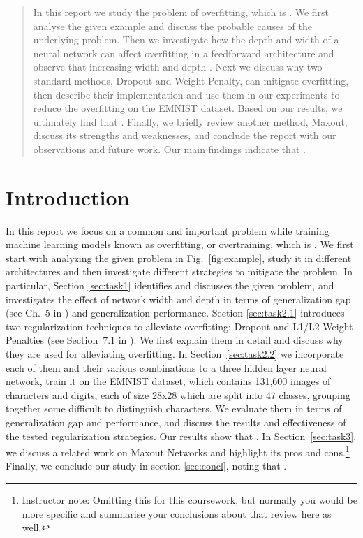 \documentclass{article}
\begin{document}
 


\begin{abstract} 
In this report we study the problem of overfitting, which is \questionOne.
We first analyse the given example and discuss the probable causes of the underlying problem. 
Then we investigate how the depth and width of a neural network
can affect overfitting in a feedforward architecture and observe that increasing width and depth \questionTwo.
Next we discuss why two standard methods, Dropout and Weight Penalty, can
mitigate overfitting, then describe their implementation and use them in our experiments
to reduce the overfitting on the EMNIST dataset. 
Based on our results, we ultimately find that \questionThree.
Finally, we briefly review another method, Maxout, discuss its strengths and weaknesses, and conclude the report with our observations and future work. Our main findings indicate that \questionFour.
\end{abstract} 

\section{Introduction}
\label{sec:intro}
In this report we focus on a common and important problem while training machine learning models known as overfitting, or overtraining, which is \questionOne.
We first start with analyzing the given problem in Fig.~\ref{fig:example}, study it in different architectures and then investigate different strategies to mitigate the problem.
In particular, Section \ref{sec:task1} identifies and discusses the given problem, and investigates the effect of network width and depth in terms of generalization gap (see Ch.~5 in \citealt{Goodfellow-et-al-2016}) and generalization performance.
Section \ref{sec:task2.1} introduces two regularization techniques to alleviate overfitting: Dropout \cite{srivastava2014dropout} and L1/L2 Weight Penalties (see Section~7.1 in \citealt{Goodfellow-et-al-2016}). 
We first explain them in detail and discuss why they are used for alleviating overfitting.
In Section~\ref{sec:task2.2} we incorporate each of them and their various combinations to a three hidden layer neural network, train it on the EMNIST dataset, which contains 131,600 images of characters and digits, each of size 28x28 which are split into 47 classes, grouping together some difficult to distinguish characters.
We evaluate them in terms of generalization gap and performance, and discuss the results and effectiveness of the tested regularization strategies.
Our results show that \questionThree.
In Section~\ref{sec:task3}, we discuss a related work on Maxout Networks and highlight its pros and cons.\footnote{Instructor note: Omitting this for this coursework, but normally you would be more specific and summarise your conclusions about that review here as well.}
Finally, we conclude our study in section \ref{sec:concl}, noting that \questionFour.
\end{document}
